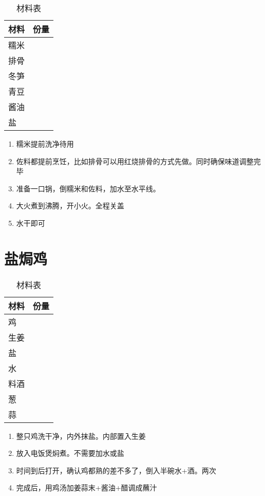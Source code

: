 \begin{table}[H]
    \centering
    \begin{tabular}{|l||c|}\hline
     \textbf{材料}    &  \textbf{份量}\\ \hline\hline
    糯米   &   \\ \hline
    排骨    &   \\ \hline
    冬笋 &  \\ \hline 
    青豆 & \\ \hline
    酱油 &  \\ \hline
    盐 & \\ \hline 
    \end{tabular}
    \caption{材料表}
\end{table}

\begin{enumerate}
    \item 糯米提前洗净待用
    \item 佐料都提前烹饪，比如排骨可以用红烧排骨的方式先做。同时确保味道调整完毕
    \item 准备一口锅，倒糯米和佐料，加水至水平线。
    \item 大火煮到沸腾，开小火。全程关盖
    \item 水干即可
\end{enumerate}


\section{盐焗鸡}

\begin{table}[H]
    \centering
    \begin{tabular}{|l||c|}\hline
     \textbf{材料}    &  \textbf{份量}\\ \hline\hline
    鸡   &   \\ \hline
    生姜    &   \\ \hline
    盐 &  \\ \hline 
    水 & \\ \hline
    料酒 &  \\ \hline
    葱 & \\ \hline 
    蒜 & \\ \hline 
    \end{tabular}
    \caption{材料表}
\end{table}

\begin{enumerate}
    \item 整只鸡洗干净，内外抹盐。内部置入生姜
    \item 放入电饭煲焖煮。不需要加水或盐
    \item 时间到后打开，确认鸡都熟的差不多了，倒入半碗水+酒。两次
    \item 完成后，用鸡汤加姜蒜末+酱油+醋调成蘸汁
\end{enumerate}



